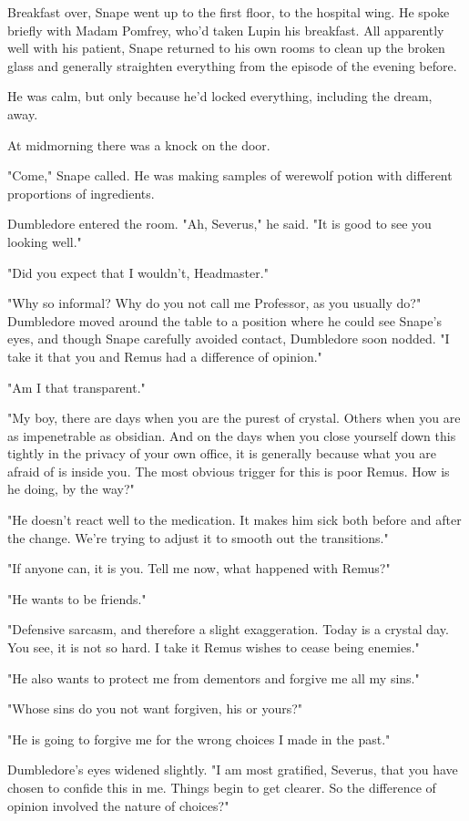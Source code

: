 Breakfast over, Snape went up to the first floor, to the hospital wing. He spoke briefly with Madam Pomfrey, who'd taken Lupin his breakfast. All apparently well with his patient, Snape returned to his own rooms to clean up the broken glass and generally straighten everything from the episode of the evening before.

He was calm, but only because he'd locked everything, including the dream, away.

At midmorning there was a knock on the door.

"Come," Snape called. He was making samples of werewolf potion with different proportions of ingredients.

Dumbledore entered the room. "Ah, Severus," he said. "It is good to see you looking well."

"Did you expect that I wouldn't, Headmaster."

"Why so informal? Why do you not call me Professor, as you usually do?" Dumbledore moved around the table to a position where he could see Snape's eyes, and though Snape carefully avoided contact, Dumbledore soon nodded. "I take it that you and Remus had a{\el} difference of opinion."

"Am I that transparent."

"My boy, there are days when you are the purest of crystal. Others when you are as impenetrable as obsidian. And on the days when you close yourself down this tightly in the privacy of your own office, it is generally because what you are afraid of is inside you. The most obvious trigger for this is poor Remus. How is he doing, by the way?"

"He doesn't react well to the medication. It makes him sick both before and after the change. We're trying to adjust it to smooth out the transitions."

"If anyone can, it is you. Tell me now, what happened with Remus?"

"He wants to be friends."

"Defensive sarcasm, and therefore a slight exaggeration. Today is a crystal day. You see, it is not so hard. I take it Remus wishes to cease being enemies."

"He also wants to protect me from dementors and forgive me all my sins."

"Whose sins do you not want forgiven, his or yours?"

"He is going to forgive me for the wrong choices I made in the past."

Dumbledore's eyes widened slightly. "I am most gratified, Severus, that you have chosen to confide this in me. Things begin to get clearer. So the difference of opinion involved the nature of choices?"

